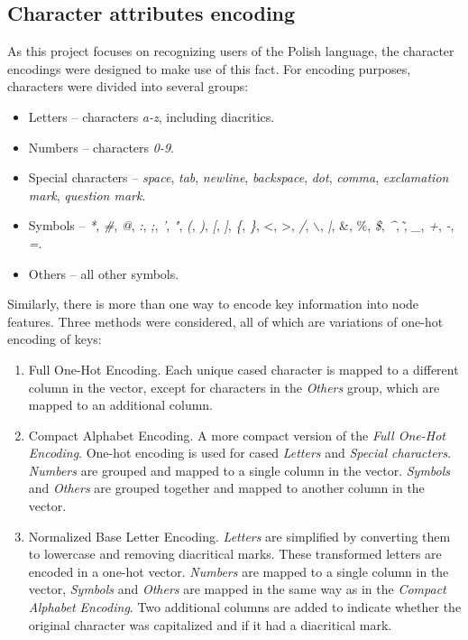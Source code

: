 \subsection{Character attributes encoding}
\label{Base_letter_representation}
As this project focuses on recognizing users of the Polish language, the character encodings were designed to make use of this fact. For encoding purposes, characters were divided into several groups:
\begin{itemize}
	\item Letters -- characters \textit{a-z}, including diacritics.
	\item Numbers -- characters \textit{0-9}.
	\item Special characters -- \textit{space}, \textit{tab}, \textit{newline}, \textit{backspace}, \textit{dot}, \textit{comma}, \textit{exclamation mark}, \textit{question mark}.
	\item Symbols -- \textit{*}, \textit{\#}, \textit{@}, \textit{:}, \textit{;},   \textit{'}, \textit{"}, \textit{(}, \textit{)}, \textit{[}, \textit{]}, \textit{\{}, \textit{\}}, \textless, \textgreater, \textit{/}, \textit{$\backslash$}, \textit{|}, \&, \%, \textit{\$}, \textit{\^}, \~, \textit{\_}, \textit{+}, \textit{-}, \textit{=}. 
	\item Others -- all other symbols.
\end{itemize}
Similarly, there is more than one way to encode key information into node features.
Three methods were considered, all of which are variations of one-hot encoding of keys:
\begin{enumerate}
	\item Full One-Hot Encoding. Each unique cased character is mapped to a different column in the vector, except for characters in the \textit{Others} group, which are mapped to an additional column.
	\item Compact Alphabet Encoding. A more compact version of the \textit{Full One-Hot Encoding}. One-hot encoding is used for cased \textit{Letters} and \textit{Special characters}. \textit{Numbers} are grouped and mapped to a single column in the vector.
	\textit{Symbols} and \textit{Others} are grouped together and mapped to another column in the vector.
	\item Normalized Base Letter Encoding. \textit{Letters} are simplified by converting them to lowercase and removing diacritical marks. These transformed letters are encoded in a one-hot vector. \textit{Numbers} are mapped to a single column in the vector, \textit{Symbols} and \textit{Others} are mapped in the same way as in the \textit{Compact Alphabet Encoding}. Two additional columns are added to indicate whether the original character was capitalized and if it had a diacritical mark.
\end{enumerate}


